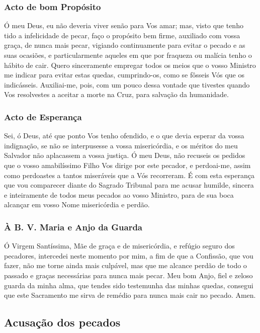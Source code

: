 \subsubsection{Acto de bom Propósito}

Ó meu Deus, eu não deveria viver senão para Vos amar; mas, visto que tenho tido a infelicidade de pecar, faço o propósito bem firme, auxiliado com vossa graça, de nunca mais pecar, vigiando continuamente para evitar o pecado e as suas ocasiões, e particularmente aqueles em que por fraqueza ou malícia tenho o hábito de cair. Quero sinceramente empregar todos os meios que o vosso Ministro me indicar para evitar estas quedas, cumprindo-os, como se fôsseis Vós que os indicásseis. Auxiliai-me, pois, com um pouco dessa vontade que tivestes quando Vos resolvestes a aceitar a morte na Cruz, para salvação da humanidade.

\subsubsection{Acto de Esperança}

Sei, ó Deus, até que ponto Vos tenho ofendido, e o que devia esperar da vossa indignação, se não se interpusesse a vossa misericórdia, e os méritos do meu Salvador não aplacassem a vossa justiça. Ó meu Deus, não recuseis os pedidos que o vosso amabilíssimo Filho Vos dirige por este pecador, e perdoai-me, assim como perdoastes a tantos miseráveis que a Vós recorreram. É com esta esperança que vou comparecer diante do Sagrado Tribunal para me acusar humilde, sincera e inteiramente de todos meus pecados ao vosso Ministro, para de sua boca alcançar em vosso Nome misericórdia e perdão.

\subsubsection{À B. V. Maria e Anjo da Guarda}

Ó Virgem Santíssima, Mãe de graça e de misericórdia, e refúgio seguro dos pecadores, intercedei neste momento por mim, a fim de que a Confissão, que vou fazer, não me torne ainda mais culpável, mas que me alcance perdão de todo o passado e graças necessárias para nunca mais pecar.
Meu bom Anjo, fiel e zeloso guarda da minha alma, que tendes sido testemunha das minhas quedas, consegui que este Sacramento me sirva de remédio para nunca mais cair no pecado. Amen.

\subsection{Acusação dos pecados}

